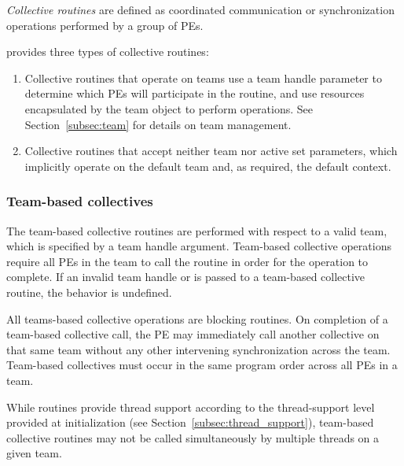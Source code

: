 \emph{Collective routines} are defined as coordinated communication or synchronization
operations performed by a group of \acp{PE}.

\openshmem provides three types of collective routines:

\begin{enumerate}
\item Collective routines that operate on teams use a team handle parameter to determine
  which \acp{PE} will participate in the routine, and use resources encapsulated by the team object
  to perform operations. See Section~\ref{subsec:team} for details on team management.


\item Collective routines that accept neither team nor active set
  parameters, which implicitly operate on the default team and, as
  required, the default context.
\end{enumerate}

\subsubsection*{Team-based collectives}

The team-based collective routines are performed with respect to a valid
\openshmem team, which is specified by a team handle argument.
Team-based collective operations require all \acp{PE} in the team to call
the routine in order for the operation to complete. If an invalid team handle
or  is passed to a team-based collective
routine, the behavior is undefined.

All \openshmem teams-based collective operations are blocking routines.  On
completion of a team-based collective call, the \ac{PE} may immediately call
another collective on that same team without any other intervening
synchronization across the team.  Team-based collectives must occur in the same
program order across all \acp{PE} in a team.

While \openshmem routines provide thread support according to the
thread-support level provided at initialization (see
Section~\ref{subsec:thread_support}), team-based collective routines
may not be called simultaneously by multiple threads on a given team.

